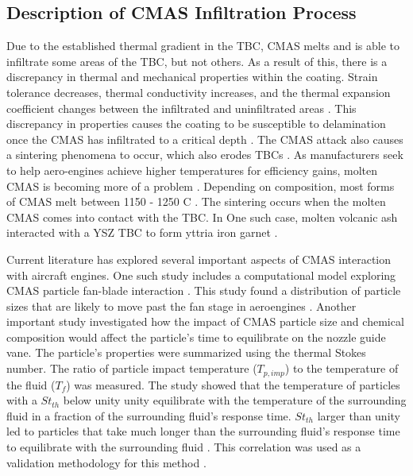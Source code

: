 \documentclass{UCF_ETD}
\begin{document}
\subsection{Description of CMAS Infiltration Process}

Due to the established thermal gradient in the TBC, CMAS melts and is able to infiltrate some areas of the TBC, but not others. As a result of this, there is a discrepancy in thermal and mechanical properties within the coating. Strain tolerance decreases, thermal conductivity increases, and the thermal expansion coefficient changes between the infiltrated and uninfiltrated areas \cite{KRAMER200826, WU20111881, KAKUDA2015350}. This discrepancy in properties causes the coating to be susceptible to delamination once the CMAS has infiltrated to a critical depth \cite{MERCER20051029}. The CMAS attack also causes a sintering phenomena to occur, which also erodes TBCs \cite{Peng2012}. As manufacturers seek to help aero-engines achieve higher temperatures for efficiency gains, molten CMAS is becoming more of a problem \cite{Boyce2012}. Depending on composition, most forms of CMAS melt between 1150 - 1250 \degree C \cite{Costa2019,Naraparaju2014,Wellman2010,Kramer2006}. The sintering occurs when the molten CMAS comes into contact with the TBC. In One such case, molten volcanic ash interacted with a YSZ TBC to form yttria iron garnet \cite{Xia2019}.

Current literature has explored several important aspects of CMAS interaction with aircraft engines. One such study includes a computational model exploring CMAS particle fan-blade interaction \cite{Vogel2018}. This study found a distribution of particle sizes that are likely to move past the fan stage in aeroengines \cite{Vogel2018}. Another important study investigated how the impact of CMAS particle size and chemical composition would affect the particle’s time to equilibrate on the nozzle guide vane. The particle’s properties were summarized using the thermal Stokes number. The ratio of particle impact temperature ($T_{p,imp}$) to the temperature of the fluid ($T_f$) was measured. The study showed that the temperature of particles with a $St_{th}$ below unity unity equilibrate with the temperature of the surrounding fluid in a fraction of the surrounding fluid’s response time. $St_{th}$ larger than unity led to particles that take much longer than the surrounding fluid’s response time to equilibrate with the surrounding fluid \cite{Bojdo2019}. This correlation was used as a validation methodology for this method \cite{Cavainolo2022}.
\end{document}
